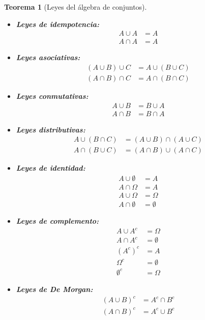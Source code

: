\documentclass[12pt]{article}
\newtheorem{theorem}{Teorema}[section]
\begin{document}
\begin{theorem}[Leyes del álgebra de conjuntos]~\\
    \begin{itemize}
        \item[1.] \textbf{Leyes de idempotencia:} 
        \begin{align*}
            A\cup A &= A \\
            A\cap A &=A
        \end{align*}
        \item[2.] \textbf{Leyes asociativas:} 
        \begin{align*}
            (A\cup B)\cup C &= A \cup (B\cup C)\\
            (A\cap B)\cap C &= A\cap (B \cap C)
        \end{align*} 
        \item[3.] \textbf{Leyes conmutativas:} 
        \begin{align*}
            A\cup B &= B\cup A\\
            A\cap B &= B \cap A
        \end{align*}
        \item[4.] \textbf{Leyes distributivas:} 
        \begin{align*}
            A\cup (B\cap C) &= (A\cup B)\cap (A\cup C)\\
            A\cap (B\cup C) &= (A\cap B)\cup (A\cap C)
        \end{align*} 
        \item[5.] \textbf{Leyes de identidad:} 
        \begin{align*}
            A\cup \emptyset &= A\\
            A\cap \Omega &= A\\
            A\cup \Omega &= \Omega\\
            A\cap \emptyset &= \emptyset
        \end{align*} 
        \item[6.] \textbf{Leyes de complemento:} 
        \begin{align*}
            A\cup A^c &= \Omega\\
            A\cap A^c &= \emptyset\\
            (A^c)^c &= A\\
            \Omega^c&=\emptyset\\
            \emptyset^c&= \Omega
        \end{align*} 
        \item[7.] \textbf{Leyes de De Morgan:} 
        \begin{align*}
            (A\cup B)^c &=A^c \cap B^c\\
            (A\cap B)^c &=A^c \cup B^c
        \end{align*} 
    \end{itemize}
\end{theorem}
\end{document}
